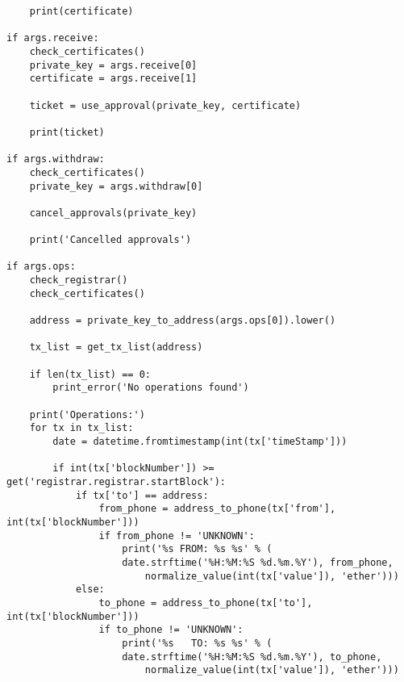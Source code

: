 \begin{verbatim}
    print(certificate)

if args.receive:
    check_certificates()
    private_key = args.receive[0]
    certificate = args.receive[1]

    ticket = use_approval(private_key, certificate)

    print(ticket)

if args.withdraw:
    check_certificates()
    private_key = args.withdraw[0]

    cancel_approvals(private_key)

    print('Cancelled approvals')

if args.ops:
    check_registrar()
    check_certificates()

    address = private_key_to_address(args.ops[0]).lower()

    tx_list = get_tx_list(address)

    if len(tx_list) == 0:
        print_error('No operations found')

    print('Operations:')
    for tx in tx_list:
        date = datetime.fromtimestamp(int(tx['timeStamp']))

        if int(tx['blockNumber']) >= get('registrar.registrar.startBlock'):
            if tx['to'] == address:
                from_phone = address_to_phone(tx['from'], int(tx['blockNumber']))
                if from_phone != 'UNKNOWN':
                    print('%s FROM: %s %s' % (
                    date.strftime('%H:%M:%S %d.%m.%Y'), from_phone, 
                        normalize_value(int(tx['value']), 'ether')))
            else:
                to_phone = address_to_phone(tx['to'], int(tx['blockNumber']))
                if to_phone != 'UNKNOWN':
                    print('%s   TO: %s %s' % (
                    date.strftime('%H:%M:%S %d.%m.%Y'), to_phone, 
                        normalize_value(int(tx['value']), 'ether')))
\end{verbatim}

